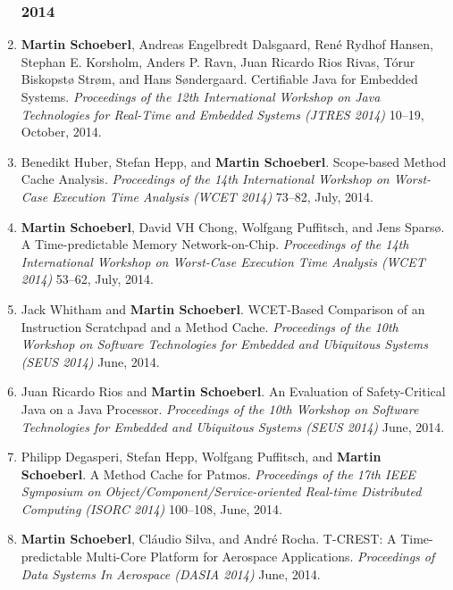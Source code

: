\begin{enumerate}
\subsubsection*{2014}

\item {\bf Martin Schoeberl}, Andreas Engelbredt Dalsgaard, Ren\'{e} Rydhof Hansen, Stephan E. Korsholm, Anders P. Ravn, Juan Ricardo Rios Rivas, T\'{o}rur Biskopst{\o} Str{\o}m, and Hans S{\o}ndergaard.
 Certifiable Java for Embedded Systems.
 \emph{Proceedings of the 12th International Workshop on Java Technologies for Real-Time and Embedded Systems (JTRES 2014)} 10--19, October, 2014.

\item Benedikt Huber, Stefan Hepp, and {\bf Martin Schoeberl}.
 Scope-based Method Cache Analysis.
 \emph{Proceedings of the 14th International Workshop on Worst-Case Execution Time Analysis (WCET 2014)} 73--82, July, 2014.

\item {\bf Martin Schoeberl}, David VH Chong, Wolfgang Puffitsch, and Jens Spars{\o}.
 A Time-predictable Memory Network-on-Chip.
 \emph{Proceedings of the 14th International Workshop on Worst-Case Execution Time Analysis (WCET 2014)} 53--62, July, 2014.

\item Jack Whitham and {\bf Martin Schoeberl}.
 WCET-Based Comparison of an Instruction Scratchpad and a Method Cache.
 \emph{Proceedings of the 10th Workshop on Software Technologies for Embedded and Ubiquitous Systems (SEUS 2014)} June, 2014.

\item Juan Ricardo Rios and {\bf Martin Schoeberl}.
 An Evaluation of Safety-Critical Java on a Java Processor.
 \emph{Proceedings of the 10th Workshop on Software Technologies for Embedded and Ubiquitous Systems (SEUS 2014)} June, 2014.

\item Philipp Degasperi, Stefan Hepp, Wolfgang Puffitsch, and {\bf Martin Schoeberl}.
 A Method Cache for Patmos.
 \emph{Proceedings of the 17th IEEE Symposium on Object/Component/Service-oriented Real-time Distributed Computing (ISORC 2014)} 100--108, June, 2014.

\item {\bf Martin Schoeberl}, Cl\'{a}udio Silva, and Andr\'{e} Rocha.
 T-CREST: A Time-predictable Multi-Core Platform for Aerospace Applications.
 \emph{Proceedings of Data Systems In Aerospace (DASIA 2014)} June, 2014.


\end{enumerate}
